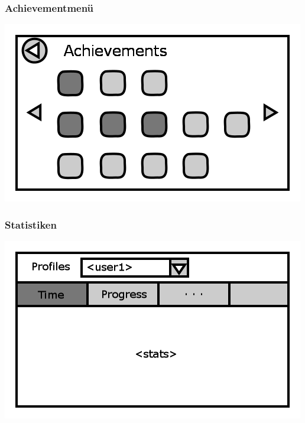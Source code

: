 \documentclass[t]{beamer}
\begin{document}
\begin{frame}
	\frametitle{Achievementmenü}
	\includegraphics[height=\textheight]{achievements.png}
\end{frame}
\begin{frame}
	\frametitle{Statistiken}
	\includegraphics[height=\textheight]{stats.png}
\end{frame}
\end{document}
